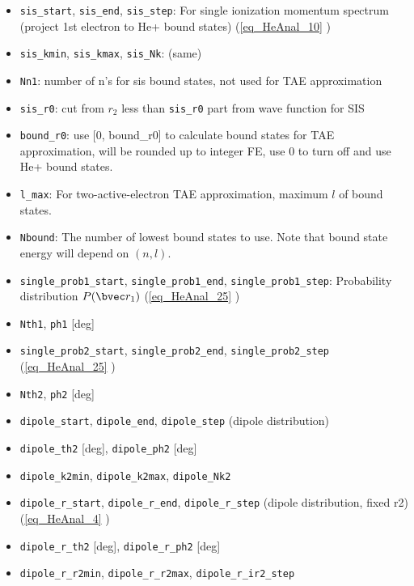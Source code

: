 \begin{itemize}
\item \verb`sis_start`, \verb`sis_end`, \verb`sis_step`: For single ionization momentum spectrum (project 1st electron to He+ bound states) (\autoref{eq_HeAnal_10} )
\item \verb`sis_kmin`, \verb`sis_kmax`, \verb`sis_Nk`: (same)
\item \verb`Nn1`: number of n's for sis bound states, not used for TAE approximation
\item \verb`sis_r0`: cut from $r_2$ less than \verb`sis_r0` part from wave function for SIS
\item \verb`bound_r0`: use [0, bound_r0] to calculate bound states for TAE approximation, will be rounded up to integer FE, use 0 to turn off and use He+ bound states.
\item \verb`l_max`: For two-active-electron TAE approximation, maximum $l$ of bound states.
\item \verb`Nbound`: The number of lowest bound states to use. Note that bound state energy will depend on $(n, l)$.

\item \verb`single_prob1_start`, \verb`single_prob1_end`, \verb`single_prob1_step`: Probability distribution $P(\bvec r_1)$ (\autoref{eq_HeAnal_25} )
\item \verb`Nth1`, \verb`ph1` [deg]

\item \verb`single_prob2_start`, \verb`single_prob2_end`, \verb`single_prob2_step` (\autoref{eq_HeAnal_25} )
\item \verb`Nth2`, \verb`ph2` [deg]

\item \verb`dipole_start`, \verb`dipole_end`, \verb`dipole_step` (dipole distribution)
\item \verb`dipole_th2` [deg], \verb`dipole_ph2` [deg]
\item \verb`dipole_k2min`, \verb`dipole_k2max`, \verb`dipole_Nk2`

\item \verb`dipole_r_start`, \verb`dipole_r_end`, \verb`dipole_r_step` (dipole distribution, fixed r2) (\autoref{eq_HeAnal_4} )
\item \verb`dipole_r_th2` [deg], \verb`dipole_r_ph2` [deg]
\item \verb`dipole_r_r2min`, \verb`dipole_r_r2max`, \verb`dipole_r_ir2_step`
\end{itemize}
